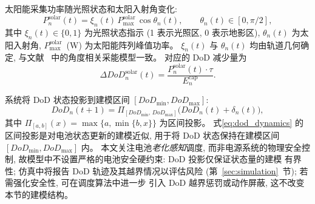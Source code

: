 \documentclass[a4paper,11pt]{article}
\begin{document}
太阳能采集功率随光照状态和太阳入射角变化:
\begin{equation}
    P^{\mathrm{solar}}_n(t) = \xi_n(t)\, P^{\mathrm{solar}}_{\max}\,
    \cos\theta_n(t),
    \qquad \theta_n(t) \in [0, \pi/2],
    \label{eq:solar_power}
\end{equation}
其中 $\xi_n(t) \in \{0, 1\}$ 为光照状态指示 (1 表示光照区,
0 表示地影区), $\theta_n(t)$ 为太阳入射角, 
$P^{\mathrm{solar}}_{\max}$~(W) 为太阳能阵列峰值功率。
$\xi_n(t)$ 与 $\theta_n(t)$ 均由轨道几何确定, 
与文献~\cite{li2024battery} 中的角度相关采能模型一致。
对应的 DoD 减少量为
\begin{equation}
    \Delta DoD^{\mathrm{solar}}_n(t)
    = \frac{P^{\mathrm{solar}}_n(t) \cdot \tau}{E^{\mathrm{cap}}_n}.
    \label{eq:dod_solar}
\end{equation}



系统将 DoD 状态投影到建模区间 $[DoD_{\min}, DoD_{\max}]$:
\begin{equation}
    DoD_n(t+1) = 
    \Pi_{[DoD_{\min},\, DoD_{\max}]}\!\big(
    DoD_n(t) + \delta_n(t)\big),
    \label{eq:dod_dynamics}
\end{equation}
其中 $\Pi_{[a,b]}(x) = \max\{a, \min\{b, x\}\}$ 为区间投影。
式\eqref{eq:dod_dynamics} 的区间投影是对电池状态更新的建模近似,
用于将 DoD 状态保持在建模区间 $[DoD_{\min}, DoD_{\max}]$ 内。
本文关注电池\emph{老化感知}调度, 而非电源系统的物理安全控制,
故模型中不设置严格的电池安全硬约束: DoD 投影仅保证状态量的建模
有界性; 仿真中将报告 DoD 轨迹及其越界情况以评估风险
(第~\ref{sec:simulation}~节); 若需强化安全性, 可在调度算法中进一步
引入 DoD 越界惩罚或动作屏蔽, 这不改变本节的建模结构。
\end{document}
